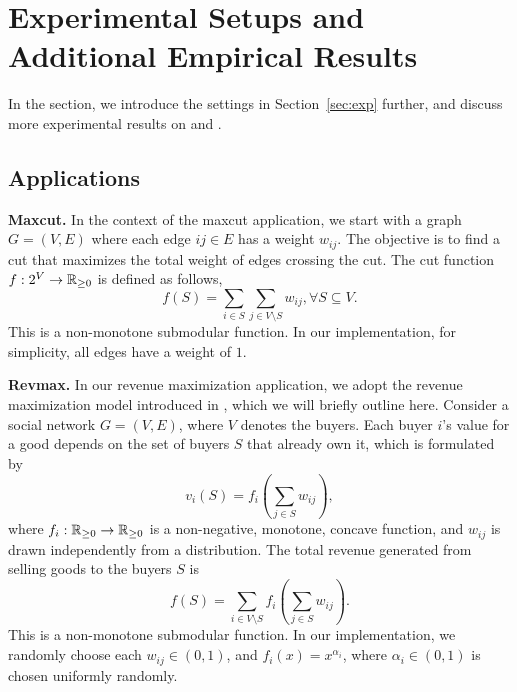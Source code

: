 \section{Experimental Setups and Additional Empirical Results}\label{apx:exp}
In the section, we introduce the settings in Section~\ref{sec:exp} further, and discuss more experimental results on \nmon and \mon.

\subsection{Applications}\label{apx:app}
\textbf{Maxcut.}
In the context of the maxcut application, we start with a graph $G=(V, E)$ 
where each edge $ij \in E$ has a weight $w_{ij}$.
The objective is to find a cut that maximizes the total weight of edges crossing the cut.
The cut function $f: 2^V \to \mathbb{R}_{\ge 0}$ is defined as follows,
\[f(S) = \sum_{i \in S} \sum_{j \in V\setminus S}w_{ij}, \forall S\subseteq V.\]
This is a non-monotone submodular function.
In our implementation, for simplicity, all edges have a weight of $1$.

\textbf{Revmax.}
In our revenue maximization application,
we adopt the revenue maximization model introduced in \citep{DBLP:conf/www/HartlineMS08}, which we will briefly outline here.
Consider a social network $G=(V, E)$,
where $V$ denotes the buyers.
Each buyer $i$'s value for a good depends on the set of buyers $S$ that already own it, 
which is formulated by 
\[v_i(S)=f_i\left(\sum_{j \in S} w_{ij}\right),\]
where $f_i: \mathbb{R}_{\ge 0} \to \mathbb{R}_{\ge 0}$ is a non-negative, monotone, concave function, and $w_{ij}$ is drawn independently from a distribution.
The total revenue generated from selling goods to the buyers $S$ is
\[f(S) = \sum_{i \in V\setminus S} f_i\left(\sum_{j \in S} w_{ij}\right).\]
This is a non-monotone submodular function.
In our implementation, 
we randomly choose each $w_{ij}\in (0,1)$,
and $f_i(x) = x^{\alpha_i}$, where $\alpha_i \in (0,1)$ is chosen uniformly randomly.


